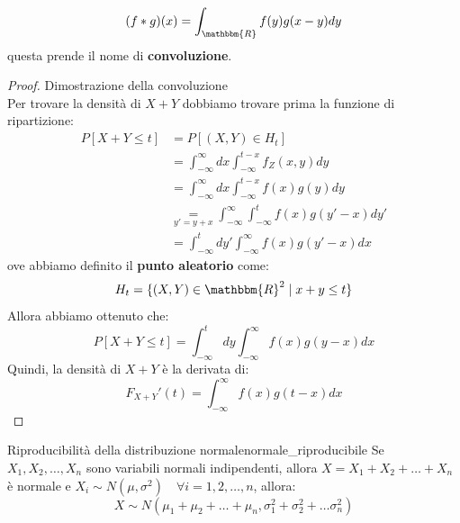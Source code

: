 \documentclass[12pt]{report}
\newcounter{theorem}
\newcommand{\nmu}{}
\begin{document}
	\[
	(f * g)(x) = \int_{\mathbbm{R}}f(y)g(x-y)dy
	\]
	questa prende il nome di \textbf{convoluzione}.
	\begin{proof}{\nmu Dimostrazione della convoluzione} \quad \\
		Per trovare la densità di $X + Y$ dobbiamo trovare prima la funzione di ripartizione:
		\begin{align*}
			P[X + Y \leq t] &= P[(X, Y) \in H_t] \\
			&= \int_{-\infty}^{\infty}dx\int_{-\infty}^{t-x}f_Z(x, y)dy \\
			&= \int_{-\infty}^{\infty}dx\int_{-\infty}^{t - x}f(x)g(y)dy \\
			&\underset{y' = y + x}{=}\int_{-\infty}^{\infty}\int_{-\infty}^{t}f(x)g(y' - x)dy' \\
			&= \int_{-\infty}^{t}dy'\int_{-\infty}^{\infty}f(x)g(y' - x)dx
		\end{align*}
		ove abbiamo definito il \textbf{punto aleatorio} come:
		\[
		H_t = \{(X, Y) \in \mathbbm{R}^2 \mid x+y \leq t\}
		\]
		Allora abbiamo ottenuto che:
		\[
		P[X + Y \leq t] = \int_{-\infty}^{t}dy\int_{-\infty}^{\infty}f(x)g(y-x)dx
		\]
		Quindi, la densità di $X + Y$ è la derivata di:
		\[
		F_{X+Y}'(t) = \int_{-\infty}^{\infty}f(x)g(t - x)dx
		\]
	\end{proof}
	\begin{theorem}{\nmu Riproducibilità della distribuzione normale}{normale_riproducibile}
		Se $X_1, X_2, \dots, X_n$ sono variabili normali indipendenti, allora $X = X_1 + X_2 + \dots + X_n$ è normale e $X_i \sim N(\mu, \sigma^2) \quad \forall i = 1, 2, \dots, n$, allora:
		\[
		X \sim N(\mu_1 + \mu_2 + \dots + \mu_n, \sigma_1^2 + \sigma_2^2 + \dots \sigma_n^2)
		\]
	\end{theorem}
\end{document}
